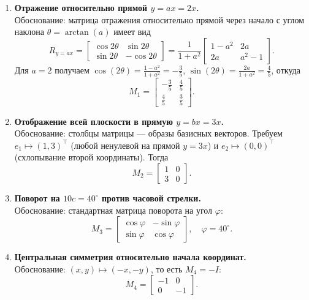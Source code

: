 \begin{enumerate}
  \item \textbf{Отражение относительно прямой $y = ax = 2x$.}\\
  Обоснование: матрица отражения относительно прямой через начало с углом наклона $\theta=\arctan(a)$ имеет вид
  \[
    R_{y=ax}=\begin{bmatrix}
      \cos 2\theta & \sin 2\theta \\
      \sin 2\theta & -\cos 2\theta
    \end{bmatrix}
    = \frac{1}{1+a^2}\begin{bmatrix} 1-a^2 & 2a \\ 2a & a^2-1 \end{bmatrix}.
  \]
  Для $a=2$ получаем $\cos(2\theta)=\tfrac{1-a^2}{1+a^2}=-\tfrac{3}{5}$, $\sin(2\theta)=\tfrac{2a}{1+a^2}=\tfrac{4}{5}$, откуда
  \[
    M_1 = \begin{bmatrix}
      -\tfrac{3}{5} & \tfrac{4}{5} \\
      \tfrac{4}{5} & \tfrac{3}{5}
    \end{bmatrix}.
  \]

  \item \textbf{Отображение всей плоскости в прямую $y = bx = 3x$.} \\
  Обоснование: столбцы матрицы — образы базисных векторов. Требуем $e_1\mapsto (1,3)^\top$ (любой ненулевой на прямой $y=3x$) и $e_2\mapsto (0,0)^\top$ (схлопывание второй координаты). Тогда
  \[
    M_2 = \begin{bmatrix}
      1 & 0 \\
      3 & 0
    \end{bmatrix}.
  \]

  \item \textbf{Поворот на $10c = 40^\circ$ против часовой стрелки.}\\
  Обоснование: стандартная матрица поворота на угол $\varphi$:
  \[
    M_3 = \begin{bmatrix}
      \cos\varphi & -\sin\varphi \\
      \sin\varphi & \cos\varphi
    \end{bmatrix},\quad \varphi=40^\circ.
  \]

  \item \textbf{Центральная симметрия относительно начала координат.}\\
  Обоснование: $(x,y)\mapsto(-x,-y)$, то есть $M_4=-I$:
  \[
    M_4 = \begin{bmatrix}
      -1 & 0 \\
      0 & -1
    \end{bmatrix}.
  \]


\end{enumerate}
